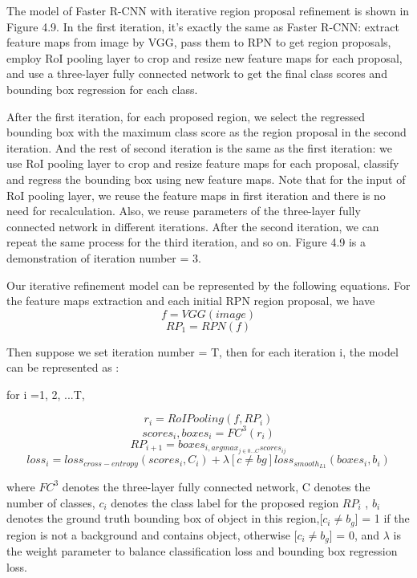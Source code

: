 The model of Faster R-CNN with iterative region proposal refinement is shown in Figure 4.9. In the first iteration, it’s exactly the same as Faster R-CNN: extract feature maps from image by VGG, pass them to RPN to get region proposals, employ RoI pooling layer to crop and resize new feature maps for each proposal, and use a three-layer fully connected network to get the final class scores and bounding box regression for each class.

After the first iteration, for each proposed region, we select the regressed bounding box with the maximum class score as the region proposal in the second iteration. And the rest of second iteration is the same as the first iteration: we use RoI pooling layer to crop and resize feature maps for each proposal, classify and regress the bounding box using new feature maps. Note that for the input of RoI pooling layer, we reuse the feature maps in first iteration and there is no need for recalculation. Also, we reuse parameters of the three-layer fully connected network in different iterations. After the second iteration, we can repeat the same process for the third iteration, and so on. Figure 4.9 is a demonstration of iteration number = 3.

Our iterative refinement model can be represented by the following equations. For the feature maps extraction and each initial RPN region proposal, we have
\[f = VGG(image)\]
\[RP_{1} = RPN(f)\]

Then suppose we set iteration number = T, then for each iteration i, the model can be represented as : 

for i =1, 2, ...T,

\[  r_{i} = RoIPooling(f,RP_{i})\]
\[scores_{i} , boxes_{i} = FC^{3}(r_{i}) \]
\[RP_{i+1} = boxes_{i , arg  max_{j \in 0... C}scores_{ij}} \]
\[loss_{i} = loss_{cross-entropy}(scores_{i} , C_{i}) + \lambda [c \neq bg ] loss_{smooth_{L1}} (boxes_{i} , b_{i})\]

where $FC^{3}$ denotes the three-layer fully connected network, C denotes the number of classes, $c_{i}$ denotes the class
label for the proposed region $RP_{i}$ , $b_{i}$ denotes the ground truth bounding box of object in this region,[$c_{i} \neq b_{g}$] = 1 if the region is not a background and contains object, otherwise [$c_{i} \neq b_{g}$] = 0, and $\lambda$ is the weight parameter to balance classification loss and bounding box regression loss.

